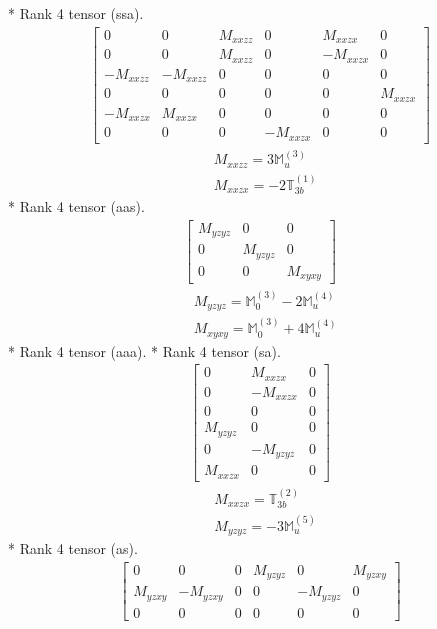 \documentclass[fleqn,8pt,landscape]{jsarticle}
\begin{document}
* Rank 4 tensor (ssa).
\begin{align*}
\begin{bmatrix} 0 & 0 & M_{xxzz} & 0 & M_{xxzx} & 0 \\ 0 & 0 & M_{xxzz} & 0 & - M_{xxzx} & 0 \\ - M_{xxzz} & - M_{xxzz} & 0 & 0 & 0 & 0 \\ 0 & 0 & 0 & 0 & 0 & M_{xxzx} \\ - M_{xxzx} & M_{xxzx} & 0 & 0 & 0 & 0 \\ 0 & 0 & 0 & - M_{xxzx} & 0 & 0 \end{bmatrix}
\end{align*}
\begin{align*}
& M_{xxzz} = 3 \mathbb{M}_{u}^{(3)} \\
& M_{xxzx} = - 2 \mathbb{T}_{3b}^{(1)}
\end{align*}
* Rank 4 tensor (aas).
\begin{align*}
\begin{bmatrix} M_{yzyz} & 0 & 0 \\ 0 & M_{yzyz} & 0 \\ 0 & 0 & M_{xyxy} \end{bmatrix}
\end{align*}
\begin{align*}
& M_{yzyz} = \mathbb{M}_{0}^{(3)} - 2 \mathbb{M}_{u}^{(4)} \\
& M_{xyxy} = \mathbb{M}_{0}^{(3)} + 4 \mathbb{M}_{u}^{(4)}
\end{align*}
* Rank 4 tensor (aaa).
* Rank 4 tensor (sa).
\begin{align*}
\begin{bmatrix} 0 & M_{xxzx} & 0 \\ 0 & - M_{xxzx} & 0 \\ 0 & 0 & 0 \\ M_{yzyz} & 0 & 0 \\ 0 & - M_{yzyz} & 0 \\ M_{xxzx} & 0 & 0 \end{bmatrix}
\end{align*}
\begin{align*}
& M_{xxzx} = \mathbb{T}_{3b}^{(2)} \\
& M_{yzyz} = - 3 \mathbb{M}_{u}^{(5)}
\end{align*}
* Rank 4 tensor (as).
\begin{align*}
\begin{bmatrix} 0 & 0 & 0 & M_{yzyz} & 0 & M_{yzxy} \\ M_{yzxy} & - M_{yzxy} & 0 & 0 & - M_{yzyz} & 0 \\ 0 & 0 & 0 & 0 & 0 & 0 \end{bmatrix}
\end{align*}
\end{document}
